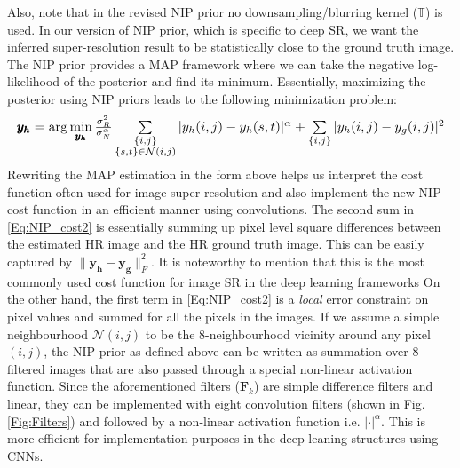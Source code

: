\documentclass[9pt]{article}
\newcommand{\vect}[1]{\pmb{#1}}
\newcommand{\mat}[1]{\pmb{#1}}
\def\bea{\begin{eqnarray}}
\def\eea{\end{eqnarray}}
\begin{document}
Also, note that in the revised NIP prior no downsampling/blurring kernel ($\mathbb{T}$) is used. In our version of NIP prior, which is specific to deep SR, we want the inferred super-resolution result to be statistically close to the ground truth image. %
The NIP prior provides a MAP framework where we can take the negative log-likelihood of the posterior and find its minimum. Essentially, maximizing the posterior using NIP priors leads to the following minimization problem:
\bea \resizebox{\columnwidth}{!}{$
\vect{y_h}  =   \arg\min\limits_{\vect{y_h}}   \frac{\sigma_R^2}{\sigma_N^\alpha}  \sum\limits_{\substack{\{i,j\} \\ \{s,t\}\in \mathcal{N}(i,j)} }   |y_h(i,j) - y_h(s,t)|^\alpha +
                                   \sum\limits_{ \{i,j\}  }  | y_h(i,j)  - y_g(i,j)|^2
                                   $}
                                   \label{Eq:NIP_cost2}
\eea
Rewriting the MAP estimation in the form above helps us interpret the cost function often used for image super-resolution and also implement the new NIP cost function in an efficient manner using convolutions. The second sum in \eqref{Eq:NIP_cost2} is essentially summing up pixel level square differences between the estimated HR image and the HR ground truth image. This can be easily captured by $\| \mat{y_h}  - \mat{y_g} \|_F^2$. It is noteworthy to mention that this is the most commonly used cost function for image SR in the deep learning frameworks %
On the other hand, the first term in \eqref{Eq:NIP_cost2} is a \emph{local} error constraint on pixel values and summed for all the pixels in the images. If we assume a simple neighbourhood $\mathcal{N}(i,j)$ to be the 8-neighbourhood vicinity around any pixel $(i,j)$, the NIP prior as defined above can be written as summation over $8$ filtered images  that are also passed through a special non-linear activation function. Since the aforementioned filters ($\mat F_k$) are simple difference filters and linear, they can be implemented with eight convolution filters (shown in Fig. \ref{Fig:Filters}) and followed by a non-linear activation function i.e. $|\cdot|^\alpha$. This is more efficient for implementation purposes in the deep leaning structures using CNNs. %
\end{document}
